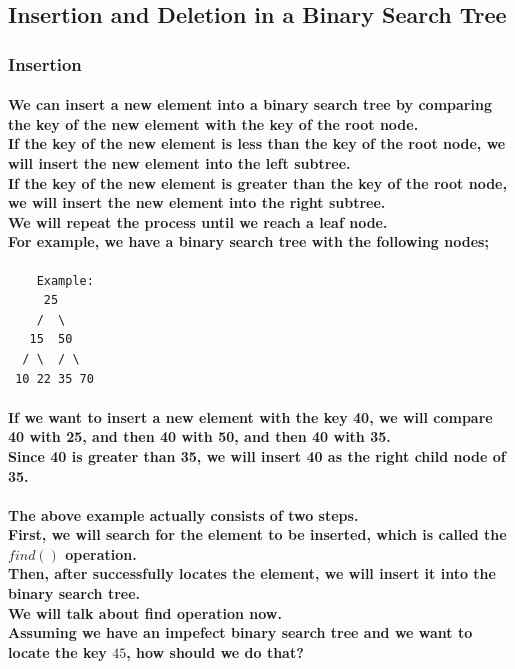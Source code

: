 \documentclass{article}
\begin{document}
\subsection{Insertion and Deletion in a Binary Search Tree}

\subsubsection{Insertion}

\paragraph{
    We can insert a new element into a binary search tree by comparing the key of the new element with the key of the root node.\\
    If the key of the new element is less than the key of the root node, we will insert the new element into the left subtree.\\
    If the key of the new element is greater than the key of the root node, we will insert the new element into the right subtree.\\
    We will repeat the process until we reach a leaf node.\\
    For example, we have a binary search tree with the following nodes;\\
}

\begin{verbatim}
    Example:
     25
    /  \
   15  50
  / \  / \
 10 22 35 70
\end{verbatim}

\paragraph{
    If we want to insert a new element with the key 40, we will compare 40 with 25, and then 40 with 50, and then 40 with 35.\\
    Since 40 is greater than 35, we will insert 40 as the right child node of 35.\\
}

\paragraph{
    The above example actually consists of two steps.\\
    First, we will search for the element to be inserted, which is called the $find()$ operation.\\
    Then, after successfully locates the element, we will insert it into the binary search tree.\\
    We will talk about find operation now.\\
    Assuming we have an impefect binary search tree and we want to locate the key $45$, how should we do that?\\
}
\end{document}

